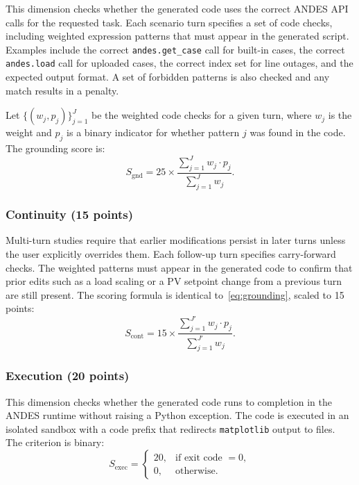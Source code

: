 \documentclass[journal]{IEEEtran}
\begin{document}
This dimension checks whether the generated code uses the correct ANDES API calls for the requested task.
Each scenario turn specifies a set of code checks, including weighted expression patterns that must appear in the generated script.
Examples include the correct \texttt{andes.get\_case} call for built-in cases, the correct \texttt{andes.load} call for uploaded cases, the correct index set for line outages, and the expected output format.
A set of forbidden patterns is also checked and any match results in a penalty.

Let $\{(w_j, p_j)\}_{j=1}^{J}$ be the weighted code checks for a given turn, where $w_j$ is the weight and $p_j$ is a binary indicator for whether pattern $j$ was found in the code. The grounding score is:
\begin{equation}
S_{\mathrm{gnd}} = 25 \times
  \frac{\sum_{j=1}^{J} w_j \cdot p_j}
       {\sum_{j=1}^{J} w_j}.
\label{eq:grounding}
\end{equation}

\subsubsection{Continuity (15 points)}

Multi-turn studies require that earlier modifications persist in later turns unless the user explicitly overrides them.
Each follow-up turn specifies carry-forward checks.
The weighted patterns must appear in the generated code to confirm that prior edits such as a load scaling or a PV setpoint change from a previous turn are still present.
The scoring formula is identical to~\eqref{eq:grounding}, scaled to 15 points:
\begin{equation}
S_{\mathrm{cont}} = 15 \times
  \frac{\sum_{j=1}^{J'} w_j \cdot p_j}
       {\sum_{j=1}^{J'} w_j}.
\label{eq:continuity}
\end{equation}

\subsubsection{Execution (20 points)}

This dimension checks whether the generated code runs to completion in the ANDES runtime without raising a Python exception.
The code is executed in an isolated sandbox with a code prefix that redirects \texttt{matplotlib} output to files.
The criterion is binary:
\begin{equation}
S_{\mathrm{exec}} =
  \begin{cases}
    20, & \text{if exit code } = 0,\\
    0,  & \text{otherwise}.
  \end{cases}
\label{eq:execution}
\end{equation}
\end{document}
